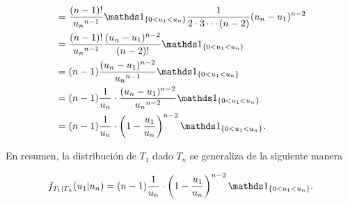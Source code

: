 \begin{align}
    &=  \frac{(n-1)!}{{u_n}^{n-1}} \indic_{\{ 0 < u_1 < u_{n}\}} \frac{1}{2 \cdot 3 \cdots (n-2)} (u_n - u_1)^{n-2}                                                                     \\
    &=  \frac{(n-1)!}{{u_n}^{n-1}} \frac{(u_n - u_1)^{n-2}}{(n-2)!} \indic_{\{ 0 < u_1 < u_{n}\}}                                                                                       \\
    &=  (n-1) \frac{(u_n - u_1)^{n-2}}{{u_n}^{n-1}} \indic_{\{ 0 < u_1 < u_{n}\}}                                                                                                       \\
    &=  (n-1) \frac{1}{u_n} \cdot \frac{(u_n - u_1)^{n-2}}{{u_n}^{n-2}} \indic_{\{ 0 < u_1 < u_{n}\}}                                                                                   \\                                                                                       
    &=  (n-1) \frac{1}{u_n} \cdot \paren{1 - \frac{u_1}{u_n}}^{n-2} \indic_{\{ 0 < u_1 < u_{n}\}}.                                                                                       \\                                                                                       
\end{align}

En resumen, la distribución de $T_1$ dado $T_n$ se generaliza de la siguiente manera

\begin{align}
    f_{T_1 | T_n}(u_1 | u_n) = (n-1) \frac{1}{u_n} \cdot \paren{1 - \frac{u_1}{u_n}}^{n-2} \indic_{\{ 0 < u_1 < u_{n}\}}.
\end{align}